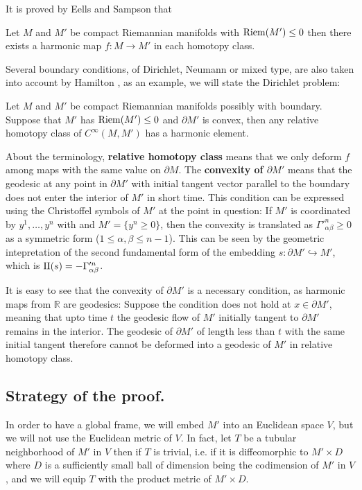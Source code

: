 It is proved by Eells and Sampson \cite{eells_harmonic_1964} that
\begin{theorem}
\label{thm:eells-sampson}
Let \(M\) and \(M'\) be compact Riemannian manifolds with \({\rm Riem } (M') \leq 0\) then there exists a harmonic map \(f: M \longrightarrow M'\) in each homotopy class.
\end{theorem}

Several boundary conditions, of Dirichlet, Neumann or mixed type, are also taken into account by Hamilton
\cite{hamilton_harmonic_1975}, as an example, we will state the Dirichlet problem:

\begin{theorem}[Hamilton]
\label{thm:hamilton-bndry-Dirichlet}
Let \(M\) and \(M'\) be compact Riemannian manifolds possibly with boundary. Suppose
that \(M'\) has \({\rm Riem } (M')\leq 0\) and \(\partial M'\) is convex, then any
relative homotopy class of \(C^\infty(M,M')\) has a harmonic element. 
\end{theorem}

About the terminology, \textbf{relative homotopy class} means that we only deform \(f\) among
maps with the same value on \(\partial M\). The \textbf{convexity of \(\partial M'\)} means
that the geodesic at any point in \(\partial M'\) with initial tangent vector parallel
to the boundary does not enter the interior of \(M'\) in short time. This condition can be expressed
using  the Christoffel symbols of \(M'\) at the point in question: If \(M'\) is
coordinated by \(y^1,\dots,y^n\) with and \(M' =\{y^n\geq 0\}\), then the convexity is
translated as \(\Gamma'^n_{\alpha\beta} \geq 0\) as a symmetric form (\(1\leq\alpha,\beta \leq n-1\)). This can be seen by the geometric intepretation of the second fundamental form of the
embedding \(s: \partial M' \hookrightarrow M'\), which is \(\sff(s) = -\Gamma'^n_{\alpha\beta}\).

It is easy to see that the convexity of \(\partial M'\) is a necessary condition, as
harmonic maps from \(\mathbb{R}\) are geodesics: Suppose the condition does not hold at
\(x\in \partial M'\), meaning that upto time \(t\) the geodesic flow of \(M'\) initially tangent to
\(\partial M'\) remains in the interior. The geodesic of \(\partial M'\) of length
less than \(t\) with the same initial tangent therefore cannot be deformed into a
geodesic of \(M'\) in relative homotopy class. 

\subsection{Strategy of the proof.}
\label{sec:org82ac6df}
In order to have a global frame, we will embed \(M'\) into an Euclidean space \(V\),
but we will not use the Euclidean metric of \(V\). In fact, let \(T\) be a tubular
neighborhood of \(M'\) in \(V\) then if \(T\) is trivial, i.e. if it is diffeomorphic to \(M'\times D\)
where \(D\) is a sufficiently small ball of dimension being the codimension of \(M'\) in \(V\), and we will equip \(T\) with the product metric of \(M'\times D\). 

